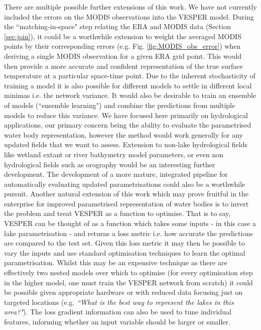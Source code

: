\documentclass[twocolumn]{article}
\begin{document}
	
	\noindent There are multiple possible further extensions of this work. We have not currently included the errors on the MODIS observations into the VESPER model. During the ``matching-in-space" step relating the ERA and MODIS data (Section \ref{sec:join}), it could be a worthwhile extension to weight the averaged MODIS points by their corresponding errors (e.g. Fig. \ref{fig:MODIS_obs_error}) when deriving a single MODIS observation for a given ERA grid point. This would then provide a more accurate and confident representation of the true surface temperature at a particular space-time point. Due to the inherent stochasticity of training a model it is also possible for different models to settle in different local minimas i.e. the network variance. It would also be desirable to train an ensemble of models (``ensemble learning") and combine the predictions from multiple models to reduce this variance. We have focused here primarily on hydrological applications, our primary concern being the ability to evaluate the parametrised water body representation, however the method would work generally for any updated fields that we want to assess. Extension to non-lake hydrological fields like wetland extant or river bathymetry model parameters, or even non hydrological fields such as orography would be an interesting further development. The development of a more mature, integrated pipeline for automatically evaluating updated parametrisations could also be a worthwhile pursuit. Another natural extension of this work which may prove fruitful in the enterprise for improved parametrised representation of water bodies is to invert the problem and treat VESPER as a function to optimise. That is to say, VESPER can be thought of as a function which takes some inputs - in this case a lake parametrisation - and returns a loss metric i.e. how accurate the predictions are compared to the test set. Given this loss metric it may then be possible to vary the inputs and use standard optimisation techniques to learn the optimal parametrisation. Whilst this may be an expensive technique as there are effectively two nested models over which to optimise (for every optimisation step in the higher model, one must train the VESPER network from scratch) it could be possible given appropriate hardware or with reduced data focusing just on targeted locations (e.g. \textit{``What is the best way to represent the lakes in this area?"}). The loss gradient information can also be used to tune individual features, informing  whether an input variable should be larger or smaller. 
	
\end{document}
